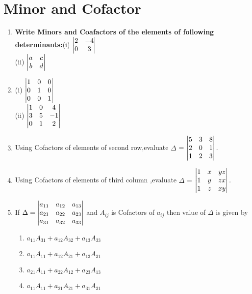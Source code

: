 \documentclass[journal,12pt,twocolumn]{IEEEtran}
\renewcommand\thesection{\arabic{section}}
\begin{document}
\section{Minor and Cofactor}
\renewcommand{\theequation}{\theenumi}
\begin{enumerate}[label=\thesection.\arabic*.,ref=\thesection.\theenumi]

\item \textbf{Write Minors and Coafactors of the elements of following determinants:}(i) $\begin{vmatrix}
2&-4 \\ 0 &3 \end{vmatrix}$ \\
(ii) $\begin{vmatrix}a&c \\ b &d\end{vmatrix}$
\item (i) $\begin{vmatrix}1&0&0 \\ 0&1&0 \\ 0&0&1\end{vmatrix}$\\
(ii) $\begin{vmatrix}1&0&4 \\ 3&5&-1 \\ 0&1&2\end{vmatrix}$
\item Using Cofactors of elements of second row,evaluate $\Delta$ =
$\begin{vmatrix} 5&3&8 \\ 2&0&1 \\ 1&2&3 \end{vmatrix}.$
\item Using Cofactors of elements of third column ,evaluate $\Delta$ = 
$\begin{vmatrix} 1&x&yz \\ 1&y&zx \\ 1&z&xy \end{vmatrix}.$
\item If $\Delta = \begin{vmatrix}
a_{11}&a_{12}&a_{13} \\ a_{21}&a_{22}&a_{23} \\ a_{31}&a_{32}&a_{33}
\end{vmatrix}$ and $A_{ij}$ is Cofactors of $a_{ij}$ then value of $\Delta$ is given by 
\begin{enumerate}
\item $a_{11}A_{31}+a_{12}A_{32}+a_{13}A_{33}$
\item $a_{11}A_{11}+a_{12}A_{21}+a_{13}A_{31}$
\item $a_{21}A_{11}+a_{22}A_{12}+a_{23}A_{13}$
\item $a_{11}A_{11}+a_{21}A_{21}+a_{31}A_{31}$
\end{enumerate} 
\end{enumerate}
\end{document}
